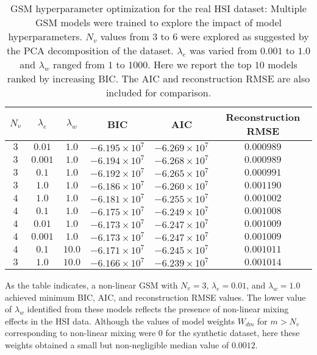 \begin{table}[H]
  \caption{GSM hyperparameter optimization for the real HSI dataset: Multiple
    GSM models were trained to explore the impact of model hyperparameters.
    $N_v$ values from $3$ to $6$ were explored as suggested by the PCA
    decomposition of the dataset. $\lambda_e$ was varied from $0.001$ to $1.0$
    and $\lambda_w$ ranged from $1$ to $1000$. Here we report the top $10$
    models ranked by increasing BIC. The AIC and reconstruction RMSE are also
    included for comparison.}
  \label{table:fit-comparison}
  \begin{center}
  \begin{tabular}{cccccc} \hline
    \textbf{$N_v$}	& \textbf{$\lambda_e$}	& \textbf{$\lambda_w$} &
    \textbf{BIC} & \textbf{AIC} & \textbf{Reconstruction RMSE}\\ \hline
    $3$ & $0.01$    & $1.0$     & $-6.195\times10^7$   & $-6.269\times10^7$   & $0.000989$ \\
    $3$	& $0.001$   & $1.0$     & $-6.194\times10^7$   & $-6.268\times10^7$   & $0.000989$ \\
    $3$	& $0.1$     & $1.0$	    & $-6.192\times10^7$   & $-6.265\times10^7$   & $0.000991$ \\
    $3$	& $1.0$     & $1.0$	    & $-6.186\times10^7$   & $-6.260\times10^7$   & $0.001190$ \\
    $4$	& $1.0$     & $1.0$	    & $-6.181\times10^7$   & $-6.255\times10^7$   & $0.001002$ \\
    $4$	& $0.1$     & $1.0$	    & $-6.175\times10^7$   & $-6.249\times10^7$   & $0.001008$ \\
    $4$	& $0.01$    & $1.0$     & $-6.173\times10^7$   & $-6.247\times10^7$   & $0.001009$ \\
    $4$	& $0.001$   & $1.0$     & $-6.173\times10^7$   & $-6.247\times10^7$   & $0.001009$ \\
    $4$	& $0.1$     & $10.0$    & $-6.171\times10^7$   & $-6.245\times10^7$   & $0.001011$ \\
    $3$	& $1.0$     & $10.0$    & $-6.166\times10^7$   & $-6.239\times10^7$   & $0.001014$
  \end{tabular}
  \end{center}
\end{table}

As the table indicates, a non-linear GSM with $N_v=3$, $\lambda_e=0.01$, and
$\lambda_w=1.0$ achieved minimum BIC, AIC, and reconstruction RMSE values. The
lower value of $\lambda_w$ identified from these models reflects the presence of
non-linear mixing effects in the HSI data. Although the values of model weights
$W_{dm}$ for $m>N_v$ corresponding to non-linear mixing were $0$ for the
synthetic dataset, here these weights obtained a small but non-negligible
median value of $0.0012$.


